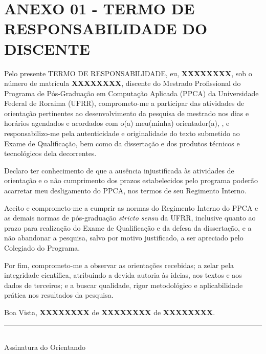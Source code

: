 \section*{ANEXO 01 - TERMO DE RESPONSABILIDADE DO DISCENTE}
\label{sec:anexo-1}

\vspace*{\fill}

Pelo presente TERMO DE RESPONSABILIDADE, eu, \textbf{XXXXXXXX}, sob o número de matrícula \textbf{XXXXXXXX}, discente do Mestrado Profissional do Programa de Pós-Graduação em Computação Aplicada (PPCA) da Universidade Federal de Roraima (UFRR), comprometo-me a participar das atividades de orientação pertinentes ao desenvolvimento da pesquisa de mestrado nos dias e horários agendados e acordados com o(a) meu(minha) orientador(a), \getorientador, e responsabilizo-me pela autenticidade e originalidade do texto submetido ao Exame de Qualificação, bem como da dissertação e dos produtos técnicos e tecnológicos dela decorrentes.

Declaro ter conhecimento de que a ausência injustificada às atividades de orientação e o não cumprimento dos prazos estabelecidos pelo programa poderão acarretar meu desligamento do PPCA, nos termos de seu Regimento Interno.

Aceito e comprometo-me a cumprir as normas do Regimento Interno do PPCA e as demais normas de pós-graduação \textit{stricto sensu} da UFRR, inclusive quanto ao prazo para realização do Exame de Qualificação e da defesa da dissertação, e a não abandonar a pesquisa, salvo por motivo justificado, a ser apreciado pelo Colegiado do Programa.

Por fim, comprometo-me a observar as orientações recebidas; a zelar pela integridade científica, atribuindo a devida autoria às ideias, aos textos e aos dados de terceiros; e a buscar qualidade, rigor metodológico e aplicabilidade prática nos resultados da pesquisa.

\vspace*{\fill}

\begin{center}
    Boa Vista, \textbf{XXXXXXXX} de \textbf{XXXXXXXX} de \textbf{XXXXXXXX}. \\[1.0cm]
    \rule{7cm}{0.4pt} \\
    \fontsize{12}{15}\selectfont Assinatura do Orientando
\end{center}


\vfill

